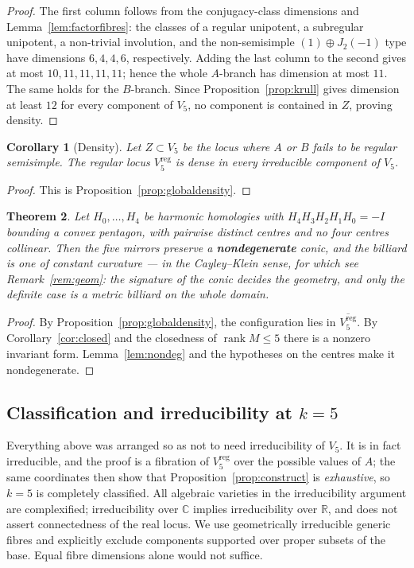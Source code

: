 \documentclass[11pt,a4paper]{article}
\theoremstyle{plain}
\newtheorem{theorem}{Theorem}[section]
\newtheorem{corollary}[theorem]{Corollary}
\theoremstyle{definition}
\theoremstyle{remark}
\newcommand{\rk}{\operatorname{rank}}
\begin{document}
\begin{proof}
The first column follows from the conjugacy-class dimensions and Lemma~\ref{lem:factorfibres}:
the classes of a regular unipotent, a subregular unipotent, a non-trivial involution,
and the non-semisimple $(1)\oplus J_2(-1)$ type have dimensions $6,4,4,6$,
respectively. Adding the last column to the second gives at most
$10,11,11,11,11$; hence the whole $A$-branch has dimension at most
$11$. The same holds for the $B$-branch. Since Proposition~\ref{prop:krull} gives
dimension at least $12$ for every component of $V_5$, no component is contained in
$Z$, proving density.
\end{proof}

\begin{corollary}[Density]\label{cor:density}
Let $Z\subset V_5$ be the locus where $A$ or $B$ fails to be regular semisimple.
The regular locus $V_5^{\mathrm{reg}}$ is dense in every irreducible component of
$V_5$.
\end{corollary}

\begin{proof}
This is Proposition~\ref{prop:globaldensity}.
\end{proof}
\begin{theorem}\label{thm:global}
Let $H_0,\dots,H_4$ be harmonic homologies with $H_4H_3H_2H_1H_0=-I$ bounding a
convex pentagon, with pairwise distinct centres and no four centres collinear.
Then the five mirrors preserve a
\textbf{nondegenerate} conic, and the billiard is one of constant curvature --- in
the Cayley--Klein sense, for which see Remark~\ref{rem:geom}: the signature of the
conic decides the geometry, and only the definite case is a metric billiard on the
whole domain.
\end{theorem}

\begin{proof}
By Proposition~\ref{prop:globaldensity}, the configuration lies in
$\overline{V_5^{\mathrm{reg}}}$. By Corollary~\ref{cor:closed} and the closedness of
$\rk M\le5$ there is a nonzero invariant form. Lemma~\ref{lem:nondeg} and the
hypotheses on the centres make it nondegenerate.
\end{proof}

\subsection{Classification and irreducibility at $k=5$}

Everything above was arranged so as not to need irreducibility of $V_5$. It is in
fact irreducible, and the proof is a fibration of $V_5^{\mathrm{reg}}$ over the
possible values of $A$; the same coordinates then show that
Proposition~\ref{prop:construct} is \emph{exhaustive}, so $k=5$ is completely
classified. All algebraic varieties in the irreducibility argument are
complexified; irreducibility over $\mathbb C$ implies irreducibility over
$\mathbb R$, and does not assert connectedness of the real locus. We use
geometrically irreducible generic fibres and explicitly exclude components
supported over proper subsets of the base. Equal fibre dimensions alone
would not suffice.
\end{document}
